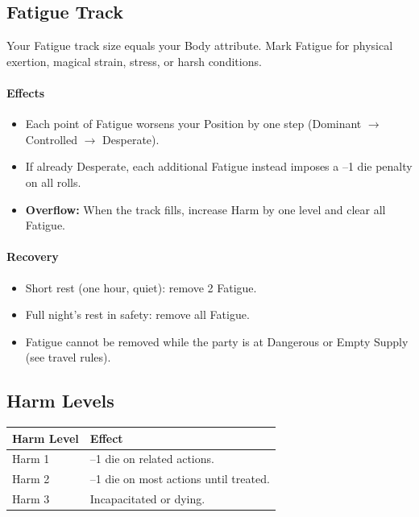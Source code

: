 \subsection{Fatigue Track}
Your Fatigue track size equals your Body attribute. Mark Fatigue for physical
exertion, magical strain, stress, or harsh conditions.

\paragraph{Effects}
\begin{itemize}
    \item Each point of Fatigue worsens your Position by one step
        (Dominant $\rightarrow$ Controlled $\rightarrow$ Desperate).
    \item If already Desperate, each additional Fatigue instead imposes a --1 die
        penalty on all rolls.
    \item \textbf{Overflow:} When the track fills, increase Harm by one level and
        clear all Fatigue.
\end{itemize}

\paragraph{Recovery}
\begin{itemize}
    \item Short rest (one hour, quiet): remove 2 Fatigue.
    \item Full night's rest in safety: remove all Fatigue.
    \item Fatigue cannot be removed while the party is at Dangerous or Empty
        Supply (see travel rules).
\end{itemize}

\subsection{Harm Levels}
\begin{center}
\begin{tabular}{ll}
\toprule
\textbf{Harm Level} & \textbf{Effect} \\
\midrule
Harm 1 & --1 die on related actions. \\
Harm 2 & --1 die on most actions until treated. \\
Harm 3 & Incapacitated or dying. \\
\bottomrule
\end{tabular}
\end{center}


